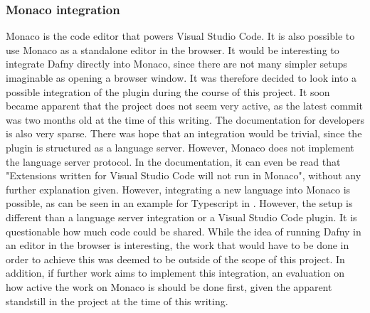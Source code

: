 \subsubsection{Monaco integration}
Monaco\cite{monaco} is the code editor that powers Visual Studio Code. It is also possible to use Monaco as a standalone editor in the browser. It would be interesting to integrate Dafny directly into Monaco, since there are not many simpler setups imaginable as opening a browser window. It was therefore decided to look into a possible integration of the plugin during the course of this project. \newline
It soon became apparent that the project does not seem very active, as the latest commit was two months old at the time of this writing. The documentation for developers is also very sparse. There was hope that an integration would be trivial, since the plugin is structured as a language server. However, Monaco does not implement the language server protocol. In the documentation, it can even be read that "Extensions written for Visual Studio Code will not run in Monaco"\cite{monaco}, without any further explanation given. \newline
However, integrating a new language into Monaco is possible, as can be seen in an example for Typescript in  \cite{monacoType}. However, the setup is different than a language server integration or a Visual Studio Code plugin. It is questionable how much code could be shared. While the idea of running Dafny in an editor in the browser is interesting, the work that would have to be done in order to achieve this was deemed to be outside of the scope of this project. In addition, if further work aims to implement this integration, an evaluation on how active the work on Monaco is should be done first, given the apparent standstill in the project at the time of this writing.